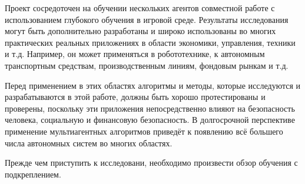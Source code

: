 Проект сосредоточен на обучении нескольких агентов совместной работе с использованием глубокого обучения в игровой среде. Результаты исследования могут быть дополнительно разработаны и широко использованы во многих практических реальных приложениях в области экономики, управления, техники и т.д. Например, он может применяться в робототехнике, к автономным транспортным средствам, производственным линиям, фондовым рынкам и т.д.

Перед применением в этих областях алгоритмы и методы, которые исследуются и разрабатываются в этой работе, должны быть хорошо протестированы и проверены, поскольку эти приложения непосредственно влияют на безопасность человека, социальную и финансовую безопасность. В долгосрочной перспективе применение мультиагентных алгоритмов приведёт к появлению всё большего числа автономных систем во многих областях.

Прежде чем приступить к исследовани, необходимо произвести обзор обучения с подкреплением.


